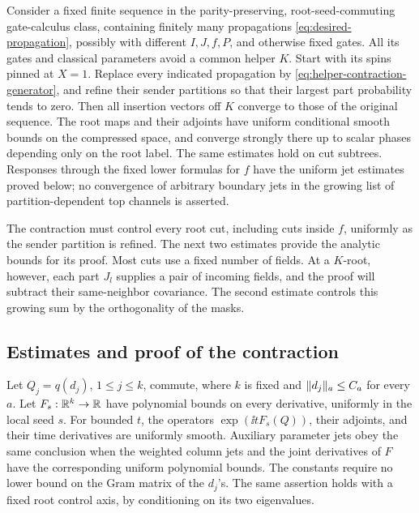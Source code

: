 \begin{proposition}
\label{prop:helper-contraction}
Consider a fixed finite sequence in the parity-preserving,
root-seed-commuting gate-calculus class, containing finitely many
propagations \eqref{eq:desired-propagation}, possibly with different
\(I,J,f,P\), and otherwise fixed gates.  All its gates and classical
parameters avoid a common helper \(K\).  Start with its spins pinned
at \(X=1\).  Replace every indicated propagation by
\eqref{eq:helper-contraction-generator}, and refine their sender
partitions so that their largest part probability tends to zero.
Then all insertion vectors off \(K\) converge to those of the
original sequence.  The root maps and their adjoints have uniform
conditional smooth bounds on the compressed space, and converge
strongly there up to scalar phases depending only on the root label.
The same estimates hold on cut subtrees.  Responses through the fixed
lower formulas for \(f\) have the uniform jet estimates proved below;
no convergence of arbitrary boundary jets in the growing list of
partition-dependent top channels is asserted.
\end{proposition}

The contraction must control every root cut, including cuts inside
\(f\), uniformly as the sender partition is refined.  The next two
estimates provide the analytic bounds for its proof.  Most cuts use a
fixed number of fields.  At a \(K\)-root, however, each part
\(J_l\) supplies a pair of incoming fields, and the proof will
subtract their same-neighbor covariance.  The second estimate controls
this growing sum by the orthogonality of the masks.

\subsection{Estimates and proof of the contraction}

\begin{lemma}
\label{lem:fixed-field-exponentials}
Let \(Q_j=q(d_j)\), \(1\le j\le k\), commute, where \(k\) is
fixed and \(\lVert d_j\rVert_a\le C_a\) for every \(a\).  Let
\(F_s:\mathbb R^k\to\mathbb R\) have polynomial bounds on every derivative,
uniformly in the local seed \(s\).  For bounded \(t\), the operators
\(\exp(\ii tF_s(Q))\), their adjoints, and their time derivatives
are uniformly smooth.  Auxiliary parameter jets obey the same conclusion
when the weighted column jets and the joint derivatives of \(F\)
have the corresponding uniform polynomial bounds.  The constants
require no lower bound on the
Gram matrix of the \(d_j\)'s.  The same assertion holds with a fixed
root control axis, by conditioning on its two eigenvalues.
\end{lemma}

